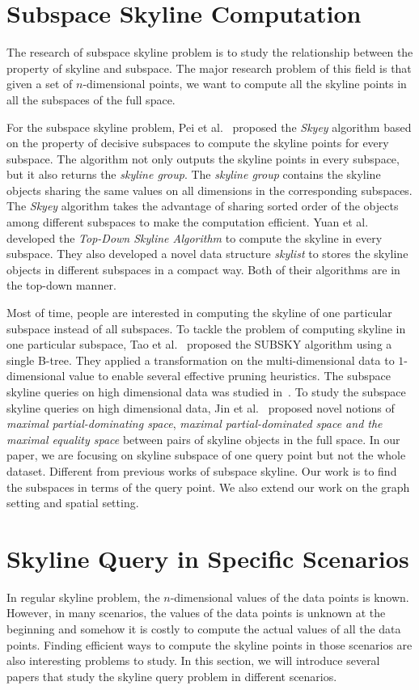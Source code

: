 \section{Subspace Skyline Computation}
\label{sec:rel:subspace}
The research of subspace skyline problem is to study the relationship between the property of skyline and subspace. The major research problem of this field is that given a set of $n$-dimensional points, we want to compute all the skyline points in all the subspaces of the full space.

For the subspace skyline problem, Pei et al.~\cite{pei2005catching} proposed the \emph{Skyey} algorithm based on the property of decisive subspaces to compute the skyline points for every subspace.  The algorithm not only outputs the skyline points in every subspace, but it also returns the \emph{skyline group}. The \emph{skyline group} contains the skyline objects sharing the same values on all dimensions in the corresponding subspaces.
The \emph{Skyey} algorithm takes the advantage of sharing sorted order of the objects among different subspaces to make the computation efficient. Yuan et al.~\cite{yuan2005efficient} developed the \emph{Top-Down Skyline Algorithm} to compute the skyline in every subspace. They also developed a novel data structure \emph{skylist} to stores the skyline objects in different subspaces in a compact way. 
Both of their algorithms are in the top-down manner.

Most of time, people are interested in computing the skyline of one particular subspace instead of all subspaces. To tackle the problem of computing skyline in one particular subspace, Tao et al.~\cite{tao2006subsky} proposed the SUBSKY algorithm using a single B-tree. They applied a transformation on the multi-dimensional data to $1$-dimensional value to enable several effective pruning heuristics.
The subspace skyline queries on high dimensional data was studied in~\cite{jin2007efficient}. To study the subspace skyline queries on high dimensional data, Jin et al.~\cite{jin2007efficient} proposed novel notions of \emph{maximal partial-dominating space}, \emph{maximal partial-dominated space and the maximal equality space} between pairs of skyline objects in the full space. In our paper, we are focusing on skyline subspace of one query point but not the whole dataset. Different from previous works of subspace skyline. Our work is to find the subspaces in terms of the query point. We also extend our work on the graph setting and spatial setting.

\section{Skyline Query in Specific Scenarios}
\label{sec:rel:constrain}
In regular skyline problem, the $n$-dimensional values of the data points is known. However, in many scenarios, the values of the data points is unknown at the beginning and somehow it is costly to compute the actual values of all the data points. Finding efficient ways to compute the skyline points in those scenarios are also interesting problems to study. In this section, we will introduce several papers that study the skyline query problem in different scenarios.

